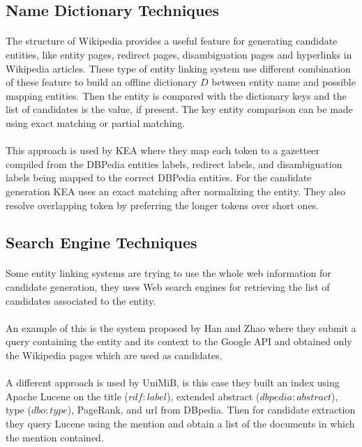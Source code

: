 \subsection{Name Dictionary Techniques}
\paragraph{}
The structure of Wikipedia provides a useful feature for generating candidate entities, like entity pages, redirect pages, disambiguation pages and hyperlinks in Wikipedia articles. These type of entity linking system use different combination of these feature to build an offline dictionary $D$ between entity name and possible mapping entities. Then the entity is compared with the dictionary keys and the list of candidates is the value, if present. The key entity comparison can be made using exact matching or partial matching. 
\paragraph{}
This approach is used by KEA\cite{waitelonisnamed} where they map each token to a gazetteer compiled from the DBPedia entities labels, redirect labels, and disambiguation labels being mapped to the correct DBPedia entities. For the candidate generation KEA uses an exact matching  after normalizing the entity. They also resolve overlapping token by preferring the longer tokens over short ones.

\subsection{Search Engine Techniques}
\paragraph{}
Some entity linking systems are trying to use the whole web information for candidate generation, they uses Web search engines for retrieving the list of candidates associated to the entity.
\paragraph{}
An example of this is the system proposed by Han and Zhao\cite{han2009nlpr_kbp} where they submit a query containing the entity and its context to the Google API and obtained only the Wikipedia pages which are used as candidates.

\paragraph{}
A different approach is used by UniMiB\cite{caliano2016unimib}, is this case they built an index using Apache Lucene on the title ($rdf\!\!:\!\!label$), extended abstract \break($dbpedia\!\!:\!\!abstract$), type ($dbo\!\!:\!\!type$), PageRank, and url from DBpedia. Then for candidate extraction they query Lucene using the mention and obtain a list of the documents in which the mention contained.

